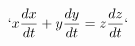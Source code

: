 \documentclass[preview]{standalone}
\begin{document}
\begin{align*}
`x \frac{dx}{dt} + y \frac{dy}{dt} = z \frac{dz}{dt}`
\end{align*}
\end{document}

